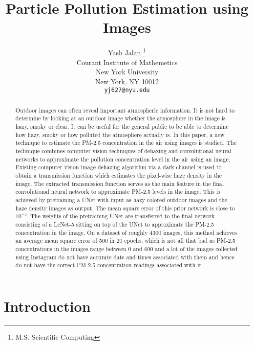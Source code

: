 \documentclass{article}
\title{Particle Pollution Estimation using Images}
\author{
  Yash Jalan \thanks{M.S. Scientific Computing} \\
  Courant Institute of Mathemetics\\
  New York University\\
  New York, NY 10012 \\
  \texttt{yj627@nyu.edu} \\
}
\begin{document}
\maketitle

\begin{abstract}
Outdoor images can often reveal important atmospheric information. It is not hard to determine by looking at an outdoor image whether the atmosphere in the image is hazy, smoky or clear. It can be useful for the general public to be able to determine how hazy, smoky or how polluted the atmosphere actually is. In this paper, a new technique to estimate the PM-2.5 concentration in the air using images is studied. The technique combines computer vision techniques of dehazing and convolutional neural networks to approximate the pollution concentration level in the air using an image. Existing computer vision image dehazing algorithm via a dark channel is used to obtain a transmission function which estimates the pixel-wise haze density in the image. The extracted transmission function serves as the main feature in the final convolutional neural network to approximate PM-2.5 levels in the image. This is achieved by pretraining a UNet with input as hazy colored outdoor images and the haze density images as output. The mean square error of this prior network is close to $10^{-5}$. The weights of the pretraining UNet are transferred to the final network consisting of a LeNet-5 sitting on top of the UNet to approximate the PM-2.5 concentration in the image. On a dataset of roughly 4300 images, this method achieves an average mean square error of 500 in 20 epochs, which is not all that bad as PM-2.5 concentrations in the images range between 0 and 600 and a lot of the images collected using Instagram do not have accurate date and times associated with them and hence do not have the correct PM-2.5 concentration readings associated with it.
\end{abstract}



\section{Introduction}
\end{document}
